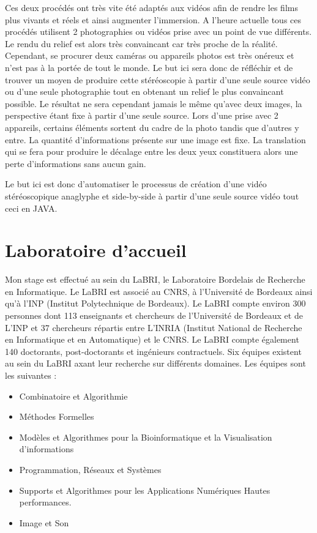 \documentclass[10pt,a4paper]{article}
\begin{document}
Ces deux procédés ont très vite été adaptés aux vidéos afin de rendre les films plus vivants et réels et ainsi augmenter l'immersion.
A l'heure actuelle tous ces procédés utilisent 2 photographies ou vidéos prise avec un point de vue différents.  Le rendu du relief est alors très convaincant car très proche de la réalité.
Cependant, se procurer deux caméras ou appareils photos est très onéreux et n'est pas à la portée de tout le monde. Le but ici sera donc de réfléchir et de trouver un moyen de produire
cette stéréoscopie à partir d'une seule source vidéo ou d'une seule photographie tout en obtenant un relief le plus convaincant possible. Le résultat ne sera cependant jamais le même qu'avec deux images,
la perspective étant fixe à partir d'une seule source. Lors d'une prise avec 2 appareils, certains éléments sortent du cadre de la photo tandis que d'autres y entre. La quantité
d'informations présente sur une image est fixe. La translation qui se fera pour produire le décalage entre les deux yeux constituera alors une perte d'informations sans aucun gain.

Le but ici est donc d'automatiser le processus de création d'une vidéo stéréoscopique anaglyphe et side-by-side à partir d'une seule source vidéo tout ceci en JAVA.

\section{Laboratoire d'accueil}

Mon stage est effectué au sein du LaBRI, le Laboratoire Bordelais de Recherche en Informatique. Le LaBRI est associé au CNRS, à l'Université de Bordeaux ainsi qu'à l'INP (Institut Polytechnique de Bordeaux)\cite{labri}.
Le LaBRI compte environ 300 personnes dont 113 enseignants et chercheurs de l'Université de Bordeaux et de L'INP et 37 chercheurs répartis entre L'INRIA (Institut National de Recherche en Informatique et en Automatique) et le CNRS. Le LaBRI compte également 140 doctorants, post-doctorants et ingénieurs contractuels.
Six équipes existent au sein du LaBRI axant leur recherche sur différents domaines. Les équipes sont les suivantes :\\

\begin{itemize}
\item Combinatoire et Algorithmie
\item Méthodes Formelles
\item Modèles et Algorithmes pour la Bioinformatique et la Visualisation d'informations
\item Programmation, Réseaux et Systèmes
\item Supports et Algorithmes pour les Applications Numériques Hautes performances.
\item Image et Son\\
\end{itemize}
\end{document}
